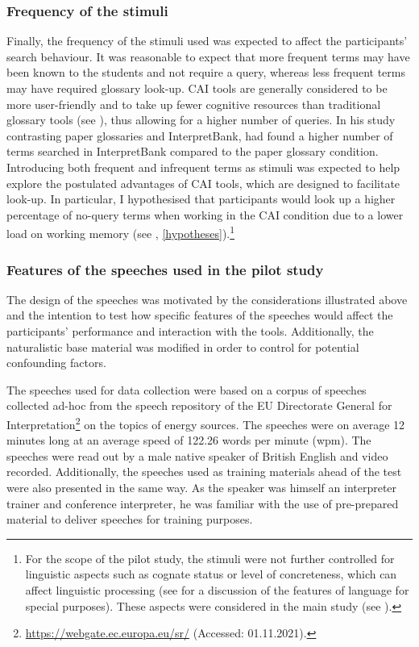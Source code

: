 \subsubsection{Frequency of the stimuli} \label{frequency}
Finally, the frequency of the stimuli used was expected to affect the participants' search behaviour. It was reasonable to expect that more frequent terms may have been known to the students and not require a query, whereas less frequent terms may have required glossary look-up. CAI tools are generally considered to be more user-friendly and to take up fewer cognitive resources than traditional glossary tools (see ), thus allowing for a higher number of queries. In his study contrasting paper glossaries and InterpretBank, \citet{biagini_glossario_2015} had found a higher number of terms searched in InterpretBank compared to the paper glossary condition. Introducing both frequent and infrequent terms as stimuli was expected to help explore the postulated advantages of CAI tools, which are designed to facilitate look-up. In particular, I hypothesised that participants would look up a higher percentage of no-query terms when working in the CAI condition due to a lower load on working memory (see , \ref{hypotheses}).\footnote{For the scope of the pilot study, the stimuli were not further controlled for linguistic aspects such as cognate status or level of concreteness, which can affect linguistic processing (see  for a discussion of the features of language for special purposes). These aspects were considered in the main study (see ).}

\subsubsection{Features of the speeches used in the pilot study} \label{featuresspeechesPS}
The design of the speeches was motivated by the considerations illustrated above and the intention to test how specific features of the speeches would affect the participants' performance and interaction with the tools. Additionally, the naturalistic base material was modified in order to control for potential confounding factors.


The speeches used for data collection were based on a corpus of speeches collected ad-hoc from the speech repository of the EU Directorate General for Interpretation\footnote{\url{https://webgate.ec.europa.eu/sr/} (Accessed: 01.11.2021).} on the topics of energy sources. The speeches were on average 12 minutes long at an average speed of 122.26 words per minute (wpm). The speeches were read out by a male native speaker of British English and video recorded. Additionally, the speeches used as training materials ahead of the test were also presented in the same way. As the speaker was himself an interpreter trainer and conference interpreter, he was familiar with the use of pre-prepared material to deliver speeches for training purposes.

